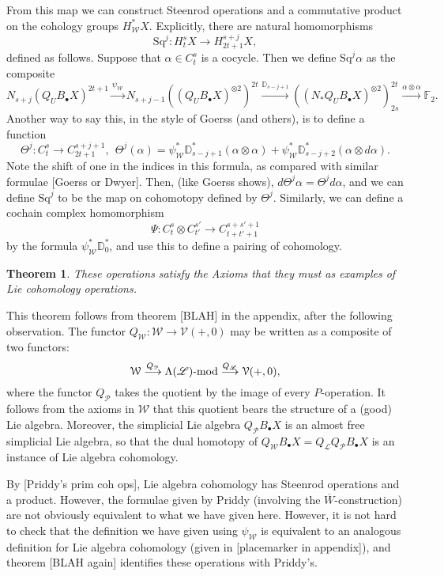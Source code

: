 \documentclass[11pt]{amsart}
\theoremstyle{plain}
\newtheorem{thm}{Theorem}[section]
\theoremstyle{definition}
\renewcommand{\to}{\longrightarrow}
\newcommand{\scrL}{\mathscr{L}}
\newcommand{\calW}{\mathcal{W}}
\newcommand{\calP}{\mathcal{P}}
\newcommand{\calV}{\mathcal{V}}
\theoremstyle{plain}
\newcommand{\Palg}{{\calP}}
\newcommand{\LieOperad}{{\scrL}}
\newcommand{\Sq}{\mathrm{Sq}}
\newcommand{\F}{\mathbb{F}}
\begin{document}
From this map we can construct Steenrod operations and a commutative product on the cohology groups $H^*_\calW X$. Explicitly, there are natural homomorphisms
\[\Sq^j:H_t^{s}X\to H_{2t+1}^{s+j}X,\]
defined as follows. Suppose that $\alpha\in C_t^{s}$ is a cocycle. Then we define $\Sq^j\alpha$ as the composite
\[N_{s+j}(Q_UB_{\bullet}X)^{2t+1}\overset{\psi_\calW}{\to}N_{s+j-1}((Q_UB_{\bullet}X)^{\otimes2})^{2t}\overset{\mathbb{D}_{s-j+1}}{\to}
((N_*Q_UB_{\bullet}X)^{\otimes2})^{2t}_{2s}\overset{\alpha\otimes\alpha}{\to}\F_2.
\]
Another way to say this, in the style of Goerss (and others), is to define a function
\[\Theta^j:C_{t}^{s}\to C_{2t+1}^{s+j+1},\ \ \Theta^j(\alpha)=\psi^*_\calW\mathbb{D}_{s-j+1}^*(\alpha\otimes\alpha)+ \psi^*_\calW\mathbb{D}_{s-j+2}^*(\alpha\otimes d\alpha).\]
Note the shift of one in the indices in this formula, as compared with similar formulae [Goerss or Dwyer].
Then, (like Goerss shows), $d\Theta^j\alpha=\Theta^jd\alpha$, and we can define $\Sq^j$ to be the map on cohomotopy defined by $\Theta^j$. Similarly, we can define a cochain complex homomorphism
\[\Psi:C_t^{s}\otimes C_{t'}^{s'}\to C_{t+t'+1}^{s+s'+1}\]
by the formula $\psi^*_\calW\mathbb{D}_0^*$, and use this to define a pairing of cohomology.
\begin{thm}
These operations satisfy the Axioms that they must as examples of Lie cohomology operations.
\end{thm}
This theorem follows from theorem [BLAH] in the appendix, after the following observation. The functor $Q_\calW:\calW\to \calV(+,0)$ may be written as a composite of two functors:
\[\calW\overset{Q_\Palg}{\to}\Lambda(\LieOperad)\textup{-mod}\overset{Q_{\LieOperad}}{\to}\calV(+,0),\]
where the functor $Q_\Palg$ takes the quotient by the image of every $P$-operation. It follows from the axioms in $\calW$ that this quotient bears the structure of a (good) Lie algebra. Moreover, the simplicial Lie algebra $Q_\Palg B_\bullet X$ is an almost free simplicial Lie algebra, so that the dual homotopy of $Q_\calW B_\bullet X=Q_{\LieOperad} Q_\Palg B_\bullet X$ is an instance of Lie algebra cohomology.

By [Priddy's prim coh ops], Lie algebra cohomology has Steenrod operations and a product. However, the formulae given by Priddy (involving the $\overline{W}$-construction) are not obviously equivalent to what we have given here. However, it is not hard to check that the definition we have given using $\psi_\calW$ is equivalent to an analogous definition for Lie algebra cohomology (given in [placemarker in appendix]), and theorem [BLAH again] identifies these operations with Priddy's.
\end{document}
